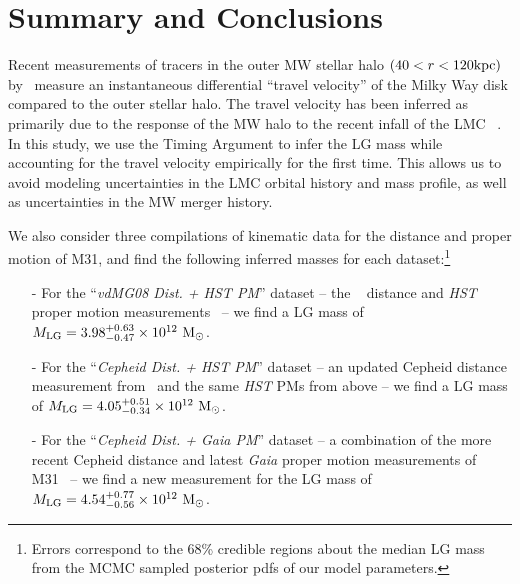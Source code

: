 \documentclass[twocolumn]{aastex631}
\newcommand{\mlg}{\ensuremath{M_{\rm LG}}}
\begin{document}

\section{Summary and Conclusions}
\label{sec:summary}
Recent measurements of tracers in the outer MW stellar halo $(40<r<120\mathrm{kpc})$
by~\cite{Petersen2021} measure an instantaneous differential ``travel velocity''
of the Milky Way disk compared to the outer stellar halo.
The travel velocity has been inferred as primarily due to the response of the
MW halo to the recent infall of the LMC
~\cite[as shown in e.g.][]{Gomez2015,Garavito-Camargo:2019,Erkal2019,
Cunningham:2020,Petersen:2020,Garavito-Camargo2021b}.
In this study, we use the Timing Argument to infer the LG mass while
accounting for the travel velocity empirically for the first time.
This allows us to avoid modeling uncertainties in the LMC orbital
history and mass profile, as well as uncertainties in the MW merger history.

We also consider three compilations of kinematic data for the distance and
proper motion of M31, and find the following inferred masses for each
dataset:\footnote{Errors correspond to the 68\% credible regions about
the median LG mass from the MCMC sampled posterior pdfs
of our model parameters.}
\begin{itemize}
  \item[-] For the ``\textit{vdMG08 Dist. + HST PM}'' dataset -- the
  ~\cite{vdm2008} distance and \textit{HST} proper motion
  measurements~\citep{Sohn:2012,vdm2012} -- we find a LG mass of
  $\mlg = 3.98^{+0.63}_{-0.47}\times10^{12}~\Msun$.
  \item[-] For the ``\textit{Cepheid Dist. + HST PM}'' dataset -- an updated
  Cepheid distance measurement from~\cite{Li2021} and the same \textit{HST} PMs
  from above -- we find a LG mass of
  $\mlg = 4.05^{+0.51}_{-0.34}\times10^{12}~\Msun$.
  \item[-] For the ``\textit{Cepheid Dist. + Gaia PM}'' dataset -- a combination
  of the more recent Cepheid distance and latest \textit{Gaia} proper motion
  measurements of M31~\citep{Li2021,Salomon2021} -- we find a new measurement for the LG mass of
  $\mlg = 4.54^{+0.77}_{-0.56}\times10^{12}~\Msun$.
\end{itemize}
\end{document}
